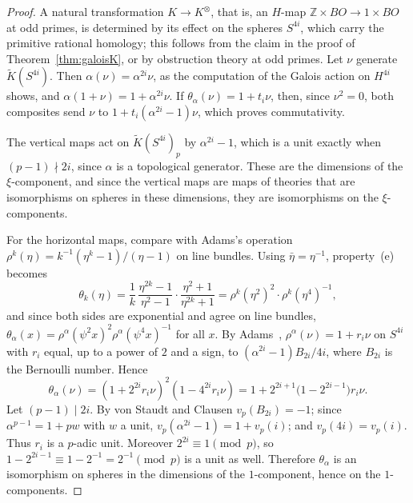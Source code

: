 \documentclass[11pt]{amsart}
\theoremstyle{plain}
\theoremstyle{definition}
\numberwithin{equation}{section}
\newcommand{\Z}{\mathbb{Z}}
\begin{document}
\begin{proof}
A natural transformation $K\to K^\otimes$, that is, an $H$-map $\Z\times BO\to1\times BO$ at odd primes, is determined by its effect on the spheres $S^{4i}$, which carry the primitive rational homology; this follows from the claim in the proof of Theorem~\ref{thm:galoisK}, or by obstruction theory at odd primes.
Let $\nu$ generate $\widetilde K(S^{4i})$.
Then $\alpha(\nu)=\alpha^{2i}\nu$, as the computation of the Galois action on $H^{4i}$ shows, and $\alpha(1+\nu)=1+\alpha^{2i}\nu$.
If $\theta_\alpha(\nu)=1+t_i\nu$, then, since $\nu^2=0$, both composites send $\nu$ to $1+t_i(\alpha^{2i}-1)\nu$, which proves commutativity.

The vertical maps act on $\widetilde K(S^{4i})_p$ by $\alpha^{2i}-1$, which is a unit exactly when $(p-1)\nmid2i$, since $\alpha$ is a topological generator.
These are the dimensions of the $\xi$-component, and since the vertical maps are maps of theories that are isomorphisms on spheres in these dimensions, they are isomorphisms on the $\xi$-components.

For the horizontal maps, compare with Adams's operation $\rho^k(\eta)=k^{-1}(\eta^k-1)/(\eta-1)$ on line bundles.
Using $\bar\eta=\eta^{-1}$, property~(e) becomes
\[
\theta_k(\eta)=\frac1k\,\frac{\eta^{2k}-1}{\eta^2-1}\cdot\frac{\eta^2+1}{\eta^{2k}+1}=\rho^k(\eta^2)^2\cdot\rho^k(\eta^4)^{-1},
\]
and since both sides are exponential and agree on line bundles, $\theta_\alpha(x)=\rho^\alpha(\psi^2x)^2\rho^\alpha(\psi^4x)^{-1}$ for all $x$.
By Adams~\cite{AdamsJ2}, $\rho^\alpha(\nu)=1+r_i\nu$ on $S^{4i}$ with $r_i$ equal, up to a power of $2$ and a sign, to $(\alpha^{2i}-1)B_{2i}/4i$, where $B_{2i}$ is the Bernoulli number.
Hence
\[
\theta_\alpha(\nu)=(1+2^{2i}r_i\nu)^2(1-4^{2i}r_i\nu)=1+2^{2i+1}\bigl(1-2^{2i-1}\bigr)r_i\nu .
\]
Let $(p-1)\mid2i$.
By von Staudt and Clausen $v_p(B_{2i})=-1$; since $\alpha^{p-1}=1+pw$ with $w$ a unit, $v_p(\alpha^{2i}-1)=1+v_p(i)$; and $v_p(4i)=v_p(i)$.
Thus $r_i$ is a $p$-adic unit.
Moreover $2^{2i}\equiv1\pmod p$, so $1-2^{2i-1}\equiv1-2^{-1}=2^{-1}\pmod p$ is a unit as well.
Therefore $\theta_\alpha$ is an isomorphism on spheres in the dimensions of the $1$-component, hence on the $1$-components.
\end{proof}
\end{document}
